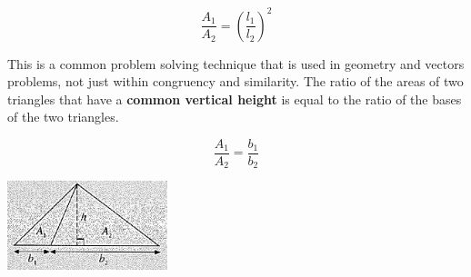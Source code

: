 \documentclass[twocolumn]{article}
\begin{document}
$$\frac{A_1}{A_2}=\left(\frac{l_1}{l_2}\right)^2$$

\bigskip 

\noindent 
This is a common problem solving technique that is used in geometry and vectors problems, not just within congruency and similarity. The ratio of the areas of two triangles that have a {\bf common vertical height} is equal to the ratio of the bases of the two triangles.

$$\frac{A_1}{A_2}=\frac{b_1}{b_2}$$

\includegraphics[width=0.35\textwidth]{99.png}
\end{document}
